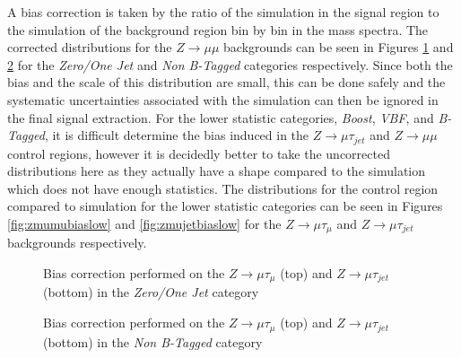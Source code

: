 A bias correction is taken by the ratio of the simulation in the signal region to the simulation of the background region bin by bin in the mass spectra. 
The corrected distributions for the $Z\rightarrow\mu\mu$ backgrounds can be seen in Figures \ref{fig:zmumucorrectionzerojets} and \ref{fig:zmumucorrectionwobtag} for the \emph{Zero/One Jet} and \emph{Non B-Tagged} categories respectively. 
Since both the bias and the scale of this distribution are small, this can be done safely and the systematic uncertainties associated with the simulation can then be ignored in the final signal extraction.
For the lower statistic categories, \emph{Boost}, \emph{VBF}, and \emph{B-Tagged},  it is difficult determine the bias induced in the $Z\rightarrow\mu\tau_{jet}$ and $Z\rightarrow\mu\mu$ control regions, however it is decidedly better to take the uncorrected distributions here as they actually have a shape compared to the simulation which does not have enough statistics.
The distributions for the control region compared to simulation for the lower statistic categories can be seen in Figures \ref{fig:zmumubiaslow} and \ref{fig:zmujetbiaslow} for the $Z\rightarrow\mu\tau_{\mu}$ and $Z\rightarrow\mu\tau_{jet}$ backgrounds respectively.
\begin{figure}[ht]
\centering
{}

\caption{Bias correction performed on the $Z\rightarrow\mu\tau_{\mu}$ (top) and $Z\rightarrow\mu\tau_{jet}$ (bottom) in the \emph{Zero/One Jet} category}
\label{fig:zmumucorrectionzerojets}
\end{figure}
\begin{figure}[tpb]
\centering
{}

\caption{Bias correction performed on the $Z\rightarrow\mu\tau_{\mu}$ (top) and $Z\rightarrow\mu\tau_{jet}$ (bottom) in the \emph{Non B-Tagged} category}
\label{fig:zmumucorrectionwobtag}
\end{figure}

